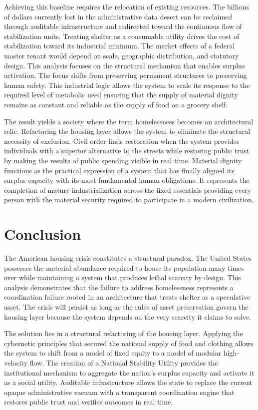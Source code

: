 \documentclass[12pt, letterpaper]{article}
\begin{document}
Achieving this baseline requires the relocation of existing resources. The billions of dollars currently lost in the administrative data desert can be reclaimed through auditable infrastructure and redirected toward the continuous flow of stabilization units. Treating shelter as a consumable utility drives the cost of stabilization toward its industrial minimum. The market effects of a federal master tenant would depend on scale, geographic distribution, and statutory design. This analysis focuses on the structural mechanism that enables surplus activation. The focus shifts from preserving permanent structures to preserving human safety. This industrial logic allows the system to scale its response to the required level of metabolic need ensuring that the supply of material dignity remains as constant and reliable as the supply of food on a grocery shelf.

The result yields a society where the term homelessness becomes an architectural relic. Refactoring the housing layer allows the system to eliminate the structural necessity of exclusion. Civil order finds restoration when the system provides individuals with a superior alternative to the streets while restoring public trust by making the results of public spending visible in real time. Material dignity functions as the practical expression of a system that has finally aligned its surplus capacity with its most fundamental human obligations. It represents the completion of mature industrialization across the fixed essentials providing every person with the material security required to participate in a modern civilization.

\section{Conclusion}

The American housing crisis constitutes a structural paradox. The United States possesses the material abundance required to house its population many times over while maintaining a system that produces lethal scarcity by design. This analysis demonstrates that the failure to address homelessness represents a coordination failure rooted in an architecture that treats shelter as a speculative asset. The crisis will persist as long as the rules of asset preservation govern the housing layer because the system depends on the very scarcity it claims to solve.

The solution lies in a structural refactoring of the housing layer. Applying the cybernetic principles that secured the national supply of food and clothing allows the system to shift from a model of fixed equity to a model of modular high-velocity flow. The creation of a National Stability Utility provides the institutional mechanism to aggregate the nation's surplus capacity and activate it as a social utility. Auditable infrastructure allows the state to replace the current opaque administrative vacuum with a transparent coordination engine that restores public trust and verifies outcomes in real time.
\end{document}
